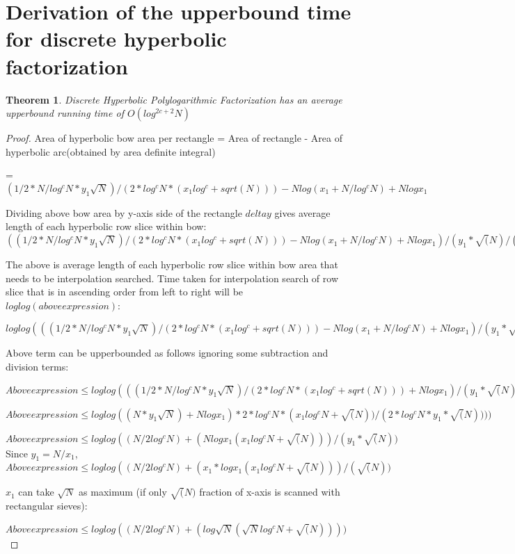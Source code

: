 \documentclass[11pt,onecolumn]{article}
\newtheorem{theorem}{Theorem}
\begin{document}
\section{Derivation of the upperbound time for discrete hyperbolic factorization}
\begin{theorem}
Discrete Hyperbolic Polylogarithmic Factorization has an average upperbound running time of $O(log^{2c+2}N)$
\end{theorem}
\begin{proof}
Area of hyperbolic bow area per rectangle = Area of rectangle - Area of hyperbolic arc(obtained by area definite integral) \

=$(1/2*N/log^{c}N * y_{1} \sqrt{N})/(2*log^{c}N*(x_{1}log^{c}+sqrt(N))) - N log(x_{1} + N/log^{c}N) + Nlogx_{1}$

Dividing above bow area by y-axis side of the rectangle $deltay$ gives average length of each hyperbolic row slice within bow: 
$((1/2*N/log^{c}N * y_{1} \sqrt{N})/(2*log^{c}N*(x_{1}log^{c}+sqrt(N))) - N log(x_{1} + N/log^{c}N) + Nlogx_{1})/(y_{1}*\sqrt(N)/(x_{1}* (log^{c}N) + \sqrt(N)))$

The above is average length of each hyperbolic row slice within bow area that needs to be interpolation searched. Time taken for interpolation search of row slice that is in ascending order from left to right will be $loglog(above expression)$:

$loglog(((1/2*N/log^{c}N * y_{1} \sqrt{N})/(2*log^{c}N*(x_{1}log^{c}+sqrt(N))) - N log(x_{1} + N/log^{c}N) + Nlogx_{1})/(y_{1}*\sqrt(N)/(x_{1}* (log^{c}N) + \sqrt(N)))
)$ 

Above term can be upperbounded as follows ignoring some subtraction and division terms:

$Above expression \le loglog(((1/2*N/log^{c}N * y_{1} \sqrt{N})/(2*log^{c}N*(x_{1}log^{c}+sqrt(N))) + Nlogx_{1})/(y_{1}*\sqrt(N)/(x_{1}* (log^{c}N) + \sqrt(N)))
)$

$Above expression \le loglog((N * y_{1} \sqrt{N}) + Nlogx_{1})*2*log^{c}N*(x_{1}log^{c}N+\sqrt(N))/(2*log^{c}N*y_{1}*\sqrt(N)))
)$

$Above expression \le loglog((N/2log^{c}N) + (Nlogx_{1}(x_{1}log^{c}N+\sqrt(N)))/(y_{1}*\sqrt(N))$
Since $y_{1}=N/x_{1}$,
$Above expression \le loglog((N/2log^{c}N) + (x_{1}*logx_{1}(x_{1}log^{c}N+\sqrt(N)))/(\sqrt(N))$

$x_{1}$ can take $\sqrt{N}$ as maximum (if only $\sqrt(N)$ fraction of x-axis is scanned with rectangular sieves):

$Above expression \le loglog((N/2log^{c}N) + (log\sqrt{N}(\sqrt{N}log^{c}N+\sqrt(N))))$


\end{proof}
\end{document}
